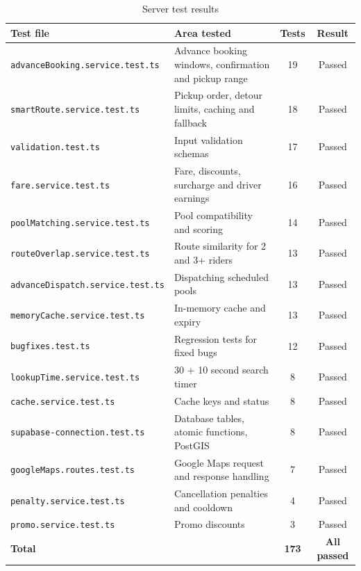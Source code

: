 \begin{table}[H]
  \centering
  \small
  \caption{Server test results}
  \label{tab:test-results}
  \begin{tabularx}{\textwidth}{@{}p{5.6cm}Lcc@{}}
    \toprule
    \textbf{Test file} & \textbf{Area tested} & \textbf{Tests} & \textbf{Result} \\
    \midrule
    \texttt{advanceBooking.service.test.ts}  & Advance booking windows, confirmation and pickup range & 19 & Passed \\
    \texttt{smartRoute.service.test.ts}      & Pickup order, detour limits, caching and fallback & 18 & Passed \\
    \texttt{validation.test.ts}              & Input validation schemas & 17 & Passed \\
    \texttt{fare.service.test.ts}            & Fare, discounts, surcharge and driver earnings & 16 & Passed \\
    \texttt{poolMatching.service.test.ts}    & Pool compatibility and scoring & 14 & Passed \\
    \texttt{routeOverlap.service.test.ts}    & Route similarity for 2 and 3+ riders & 13 & Passed \\
    \texttt{advanceDispatch.service.test.ts} & Dispatching scheduled pools & 13 & Passed \\
    \texttt{memoryCache.service.test.ts}     & In-memory cache and expiry & 13 & Passed \\
    \texttt{bugfixes.test.ts}                & Regression tests for fixed bugs & 12 & Passed \\
    \texttt{lookupTime.service.test.ts}      & 30 + 10 second search timer & 8 & Passed \\
    \texttt{cache.service.test.ts}           & Cache keys and status & 8 & Passed \\
    \texttt{supabase-connection.test.ts}     & Database tables, atomic functions, PostGIS & 8 & Passed \\
    \texttt{googleMaps.routes.test.ts}       & Google Maps request and response handling & 7 & Passed \\
    \texttt{penalty.service.test.ts}         & Cancellation penalties and cooldown & 4 & Passed \\
    \texttt{promo.service.test.ts}           & Promo discounts & 3 & Passed \\
    \midrule
    \textbf{Total} & & \textbf{173} & \textbf{All passed} \\
    \bottomrule
  \end{tabularx}
\end{table}

